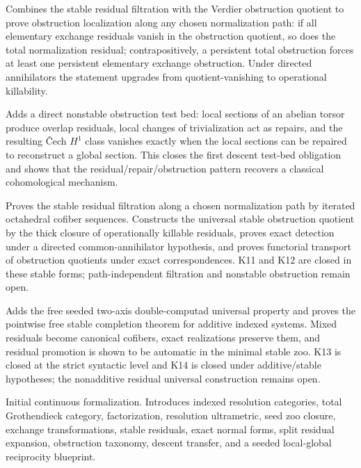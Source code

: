 \documentclass[11pt]{article}
\theoremstyle{definition}
\theoremstyle{remark}
\begin{document}
\begin{description}[leftmargin=8em,style=nextline]
\item[v0.5.0] Combines the stable residual filtration with the Verdier obstruction quotient to prove obstruction localization along any chosen normalization path: if all elementary exchange residuals vanish in the obstruction quotient, so does the total normalization residual; contrapositively, a persistent total obstruction forces at least one persistent elementary exchange obstruction. Under directed annihilators the statement upgrades from quotient-vanishing to operational killability.
\item[v0.4.0] Adds a direct nonstable obstruction test bed: local sections of an abelian torsor produce overlap residuals, local changes of trivialization act as repairs, and the resulting \v{C}ech $H^1$ class vanishes exactly when the local sections can be repaired to reconstruct a global section. This closes the first descent test-bed obligation and shows that the residual/repair/obstruction pattern recovers a classical cohomological mechanism.
\item[v0.3.0] Proves the stable residual filtration along a chosen normalization path by iterated octahedral cofiber sequences. Constructs the universal stable obstruction quotient by the thick closure of operationally killable residuals, proves exact detection under a directed common-annihilator hypothesis, and proves functorial transport of obstruction quotients under exact correspondences. K11 and K12 are closed in these stable forms; path-independent filtration and nonstable obstruction remain open.
\item[v0.2.0] Adds the free seeded two-axis double-computad universal property and proves the pointwise free stable completion theorem for additive indexed systems. Mixed residuals become canonical cofibers, exact realizations preserve them, and residual promotion is shown to be automatic in the minimal stable zoo. K13 is closed at the strict syntactic level and K14 is closed under additive/stable hypotheses; the nonadditive residual universal construction remains open.
\item[v0.1.0] Initial continuous formalization. Introduces indexed resolution categories, total Grothendieck category, factorization, resolution ultrametric, seed zoo closure, exchange transformations, stable residuals, exact normal forms, split residual expansion, obstruction taxonomy, descent transfer, and a seeded local-global reciprocity blueprint.
\end{description}
\endgroup
\end{document}
